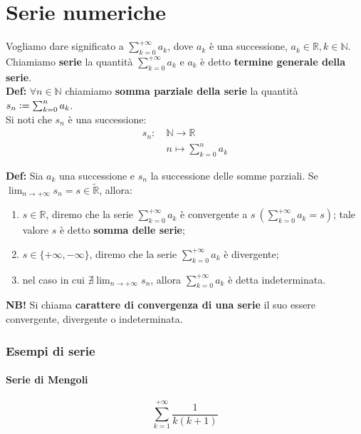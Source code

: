 \documentclass{article}
\begin{document}
\newpage
\part{Serie numeriche}
Vogliamo dare significato a $\sum_{k = 0}^{+\infty} a_k$, dove $a_k$ è una successione, $a_k \in \mathbb{R}, k \in \mathbb{N}$. Chiamiamo \textbf{serie} la quantità $\sum_{k = 0}^{+\infty} a_k$ e $a_k$ è detto \textbf{termine generale della serie}. \\

\noindent\textbf{Def:} $\forall n \in \mathbb{N}$ chiamiamo \textbf{somma parziale della serie} la quantità $s_n \vcentcolon = \sum_{k = 0}^n a_k$.\\
Si noti che $s_n$ è una successione:
\begin{align*}
    s_n: \ & \mathbb{N} \xrightarrow{} \mathbb{R} \\
    & n \longmapsto \sum_{k = 0}^n a_k
\end{align*}

\noindent\textbf{Def:} Sia $a_k$ una successione e $s_n$ la successione delle somme parziali. Se $\lim_{n \to +\infty} s_n = s \in \widetilde{\mathbb{R}}$, allora:
\begin{enumerate}
    \item $s \in \mathbb{R}$, diremo che la serie $\sum_{k = 0}^{+ \infty} a_k$ è convergente a $s \ (\sum_{k = 0}^{+\infty} a_k = s)$; tale valore $s$ è detto \textbf{somma delle serie};
    \item $s \in \{+\infty, -\infty\}$, diremo che la serie $\sum_{k = 0}^{+\infty} a_k$ è divergente;
    \item nel caso in cui $\nexists \lim_{n \to +\infty} s_n$, allora $\sum_{k = 0}^{+\infty} a_k$ è detta indeterminata.
\end{enumerate}

\noindent\textbf{NB!} Si chiama \textbf{carattere di convergenza di una serie} il suo essere convergente, divergente o indeterminata.

\section{Esempi di serie}
\subsection{Serie di Mengoli}
\begin{equation*}
    \sum_{k = 1}^{+\infty} \frac{1}{k(k + 1)}
\end{equation*}
\end{document}
